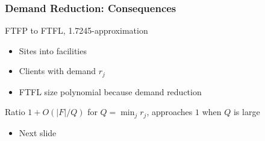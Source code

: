 \documentclass[hyperref,dvipsnames,svgnames,compress]{beamer}
\begin{document}
\begin{frame}
  \frametitle{Demand Reduction: Consequences}
  \begin{block}{}
    FTFP to FTFL, 1.7245-approximation    
  \end{block}
  \begin{itemize}
  \item Sites into facilities
  \item Clients with demand $r_j$
  \item FTFL size polynomial because demand reduction
  \end{itemize}

  \begin{block}{}
    Ratio $1 + O(|F| / Q)$ for $Q = \min_j r_j$,
    approaches $1$ when $Q$ is large
  \end{block}
  \begin{itemize}
  \item Next slide
  \end{itemize}
\end{frame}
\end{document}

